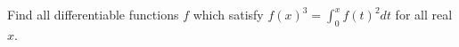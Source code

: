 Find all differentiable functions $f$ which satisfy $f(x)^3 =
\displaystyle{\int_{0}^{x} f(t)^2 dt}$ for all real $x$.
